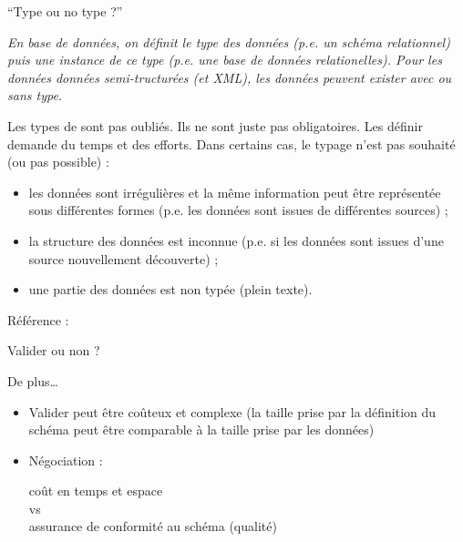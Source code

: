 \begin{frame}{``Type ou no type ?''}

\textit{En base de données, on définit le type des données (p.e. un schéma relationnel) puis une instance de ce type (p.e. une base de données relationelles). Pour les données données semi-tructurées (et XML), les données peuvent exister avec ou sans type.}

\medskip

Les types de sont pas oubliés. Ils ne sont juste pas obligatoires. Les définir demande du temps et des efforts.  Dans certains cas, le typage n'est pas souhaité (ou pas possible) :
\begin{itemize}
\item les données sont irrégulières et la même information peut être représentée sous différentes formes (p.e. les données sont issues de différentes sources) ;
\item la structure des données est inconnue (p.e. si les données sont issues d'une source nouvellement découverte) ;
\item une partie des données est non typée (plein texte).
\end{itemize}

\begin{flushright}
Référence : \cite{WDMD}
\end{flushright}

\end{frame}


\begin{frame}{Valider ou non ?}

De plus…

\begin{itemize}
\item Valider peut être coûteux et complexe (la taille prise par la définition du schéma peut être comparable à la taille prise par les données)

\item Négociation :\\
\begin{center}
coût en temps et espace \\
vs \\
assurance de conformité au schéma (qualité)
\end{center}
\end{itemize}


\end{frame}


